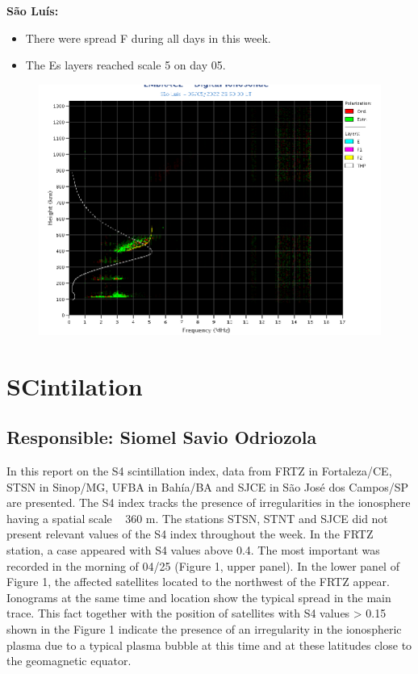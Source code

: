 \documentclass[11pt, oneside]{article}
\begin{document}
\textbf{São Luís: }

 \begin{itemize}
\item There were spread F during all days in this week.
\item The Es layers reached scale 5 on day 05. 
\end{itemize}
\begin{figure}[H]
    \centering
    \includegraphics[width=14cm]{./figures//SãoLuís.png}
\end{figure}

\section{SCintilation} 
 \subsection{Responsible: Siomel Savio Odriozola} 
 
In this report on the S4 scintillation index, data from FRTZ in Fortaleza/CE, STSN 
in Sinop/MG, UFBA in Bahía/BA and SJCE in São José dos Campos/SP are 
presented. The S4 index tracks the presence of irregularities in the ionosphere 
having a spatial scale ~ 360 m. 
The stations STSN, STNT and SJCE did not present relevant values of the S4 
index throughout the week. In the FRTZ station, a case appeared with S4 values 
above 0.4. The most important was recorded in the morning of 04/25 (Figure 1, 
upper panel). In the lower panel of Figure 1, the affected satellites located to the 
northwest of the FRTZ appear. Ionograms at the same time and location show 
the typical spread in the main trace. This fact together with the position of 
satellites with S4 values > 0.15 shown in the Figure 1 indicate the presence of an 
irregularity in the ionospheric plasma due to a typical plasma bubble at this time 
and at these latitudes close to the geomagnetic equator. 
\end{document}
